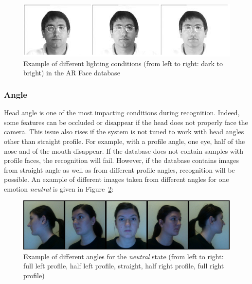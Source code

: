 \begin{figure}[!h]
\begin{center}
\noindent \includegraphics[scale=0.7]{figures/arface_example1} 
\newline
\caption{Example of different lighting conditions (from left to right: dark to bright) in the AR Face database}
\label{arface_example1}
\end{center} 
\end{figure}

\subsubsection{Angle}

\vspace{\baselineskip}
\noindent Head angle is one of the most impacting conditions during recognition. Indeed, some features can be occluded or disappear if the head does not properly face the camera. This issue also rises if the system is not tuned to work with head angles other than straight profile. For example, with a profile angle, one eye, half of the nose and of the mouth disappear. If the database does not contain samples with profile faces, the recognition will fail. However, if the database contains images from straight angle as well as from different profile angles, recognition will be possible. An example of different images taken from different angles for one emotion \textit{neutral} is given in Figure~\ref{example_angle}:
\newline

\begin{figure}[!h]
\begin{center}
\noindent \includegraphics[scale=0.3]{figures/example_angle} 
\newline
\caption{Example of different angles for the \textit{neutral} state (from left to right: full left profile, half left profile, straight, half right profile, full right profile)}
\label{example_angle}
\end{center} 
\end{figure}

